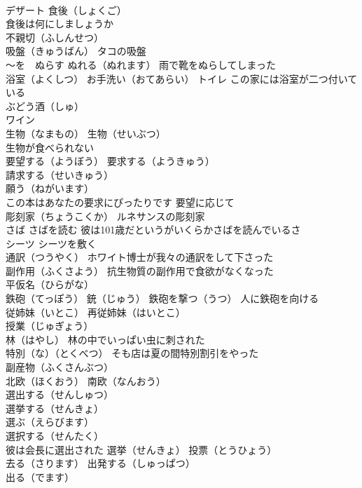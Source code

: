 \documentclass[8pt]{extreport}
\begin{document}
\begin{CJK}{UTF8}{min}
\\	デザート 食後（しょくご） 
\\	食後は何にしましょうか
\\	不親切（ふしんせつ）
\\	吸盤（きゅうばん） タコの吸盤
\\	～を　ぬらす ぬれる（ぬれます） 雨で靴をぬらしてしまった
\\	浴室（よくしつ） お手洗い（おてあらい） トイレ この家には浴室が二つ付いている
\\	ぶどう酒（しゅ）
\\	ワイン 
\\	生物（なまもの） 生物（せいぶつ）
\\	生物が食べられない
\\	要望する（ようぼう） 要求する（ようきゅう）
\\	請求する（せいきゅう）
\\	願う（ねがいます）
\\	この本はあなたの要求にぴったりです 要望に応じて
\\	彫刻家（ちょうこくか） ルネサンスの彫刻家
\\	さば さばを読む 彼は101歳だというがいくらかさばを読んでいるさ
\\	シーツ シーツを敷く
\\	通訳（つうやく） ホワイト博士が我々の通訳をして下さった
\\	副作用（ふくさよう） 抗生物質の副作用で食欲がなくなった
\\	平仮名（ひらがな）
\\	鉄砲（てっぽう） 銃（じゅう） 鉄砲を撃つ（うつ） 人に鉄砲を向ける
\\	従姉妹（いとこ） 再従姉妹（はいとこ）
\\	授業（じゅぎょう）
\\	林（はやし） 林の中でいっぱい虫に刺された
\\	特別（な）（とくべつ） そも店は夏の間特別割引をやった
\\	副産物（ふくさんぶつ）
\\	北欧（ほくおう） 南欧（なんおう）
\\	選出する（せんしゅつ）
\\	選挙する（せんきょ）
\\	選ぶ（えらびます） 
\\	選択する（せんたく） 
\\	彼は会長に選出された 選挙（せんきょ） 投票（とうひょう）
\\	去る（さります） 出発する（しゅっぱつ）
\\	出る（でます）

\end{CJK}
\end{document}
